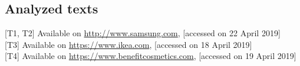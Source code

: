 \documentclass[output=paper]{langsci/langscibook}
\begin{document}
\subsection*{Analyzed texts}

[T1, T2] Available on \url{http://www.samsung.com}, [accessed on 22 April 2019]\\{}
[T3] Available on \url{https://www.ikea.com}, [accessed on 18 April 2019]\\{}
[T4] Available on \url{https://www.benefitcosmetics.com}, [accessed on 19 April 2019]
  
{\sloppy\printbibliography[heading=subbibliography,notkeyword=this]}
\end{document}
